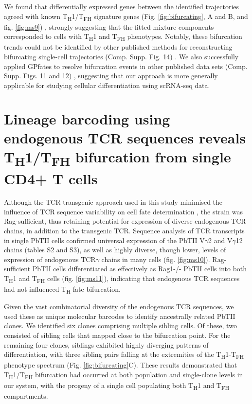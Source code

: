 We found that differentially expressed genes between the identified trajectories agreed with known T\textsubscript{H}1/T\textsubscript{FH} signature genes (Fig. \ref{fig:bifurcating}, A and B, and fig. \ref{fig:ms9}) \cite{Hale2013-yb}, strongly suggesting that the fitted mixture components corresponded to cells with T\textsubscript{H}1 and T\textsubscript{FH} phenotypes. Notably, these bifurcation trends could not be identified by other published methods for reconstructing bifurcating single-cell trajectories (Comp. Supp. Fig. 14) \cite{Marco2014-rf, Trapnell2014-cn, Chen2016-ar, Haghverdi2016-tm, Setty2016-ie}. We also successfully applied GPfates to resolve bifurcation events in other published data sets (Comp. Supp. Figs. 11 and 12) \cite{Treutlein2014-rz, Guo2015-ao}, suggesting that our approach is more generally applicable for studying cellular differentiation using scRNA-seq data.

\section{Lineage barcoding using endogenous TCR sequences reveals \texorpdfstring{T\textsubscript{H}1/T\textsubscript{FH}}{TH1/TFH} bifurcation from single CD4+ T cells}

Although the TCR transgenic approach used in this study minimised the influence of TCR sequence variability on cell fate determination \cite{Tubo2013-zg}, the strain was Rag-sufficient, thus retaining potential for expression of diverse endogenous TCR chains, in addition to the transgenic TCR. Sequence analysis of TCR transcripts in single PbTII cells confirmed universal expression of the PbTII V\( \gamma \)2 and V\( \gamma \)12 chains (tables S2 and S3), as well as highly diverse, though lower, levels of expression of endogenous TCR\( \gamma \) chains in many cells (fig. \ref{fig:ms10}). Rag-sufficient PbTII cells differentiated as effectively as Rag1-/- PbTII cells into both T\textsubscript{H}1 and T\textsubscript{FH} cells (fig. \ref{fig:ms11}), indicating that endogenous TCR sequences had not influenced T\textsubscript{H} fate bifurcation.

Given the vast combinatorial diversity of the endogenous TCR sequences, we used these as unique molecular barcodes to identify ancestrally related PbTII clones. We identified six clones comprising multiple sibling cells. Of these, two consisted of sibling cells that mapped close to the bifurcation point. For the remaining four clones, siblings exhibited highly diverging patterns of differentiation, with three sibling pairs falling at the extremities of the T\textsubscript{H}1-T\textsubscript{FH} phenotype spectrum (Fig. \ref{fig:bifurcating}C). These results demonstrated that T\textsubscript{H}1/T\textsubscript{FH} bifurcation had occurred at both population and single-clone levels in our system, with the progeny of a single cell populating both T\textsubscript{H}1 and T\textsubscript{FH} compartments.

